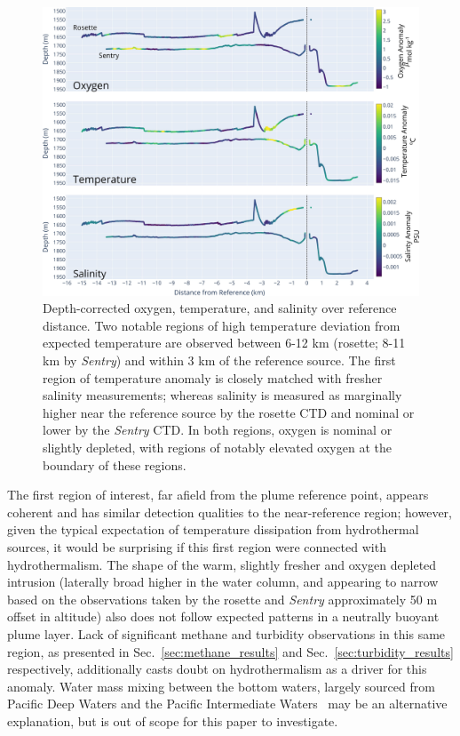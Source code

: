 \begin{figure}[h!]
    \centering
    \includegraphics[width=1\columnwidth]{figures/chap3_o2_temp_salt_over_distance.jpg}
    \caption[Depth-corrected oxygen, temperature, and salinity measurements collected during transect]{Depth-corrected oxygen, temperature, and salinity over reference distance. Two notable regions of high temperature deviation from expected temperature are observed between 6-12 km (rosette; 8-11 km by \emph{Sentry}) and within 3 km of the reference source. The first region of temperature anomaly is closely matched with fresher salinity measurements; whereas salinity is measured as marginally higher near the reference source by the rosette CTD and nominal or lower by the \emph{Sentry} CTD. In both regions, oxygen is nominal or slightly depleted, with regions of notably elevated oxygen at the boundary of these regions.}
    \label{fig:o2_temp_salt}
\end{figure}

The first region of interest, far afield from the plume reference point, appears coherent and has similar detection qualities to the near-reference region; however, given the typical expectation of temperature dissipation from hydrothermal sources, it would be surprising if this first region were connected with hydrothermalism. The shape of the warm, slightly fresher and oxygen depleted intrusion (laterally broad higher in the water column, and appearing to narrow based on the observations taken by the rosette and \emph{Sentry} approximately 50 m offset in altitude) also does not follow expected patterns in a neutrally buoyant plume layer. Lack of significant methane and turbidity observations in this same region, as presented in Sec.~\ref{sec:methane_results} and Sec.~\ref{sec:turbidity_results} respectively, additionally casts doubt on hydrothermalism as a driver for this anomaly. Water mass mixing between the bottom waters, largely sourced from Pacific Deep Waters and the Pacific Intermediate Waters~\autocite{bray1988water} may be an alternative explanation, but is out of scope for this paper to investigate. 



